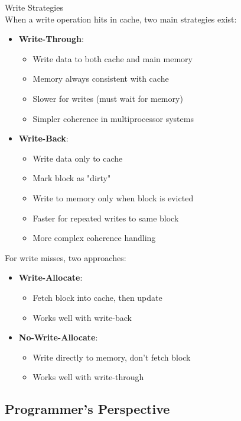 \begin{definition}{Write Strategies}\\
When a write operation hits in cache, two main strategies exist:
\begin{itemize}
    \item \textbf{Write-Through}:
    \begin{itemize}
        \item Write data to both cache and main memory
        \item Memory always consistent with cache
        \item Slower for writes (must wait for memory)
        \item Simpler coherence in multiprocessor systems
    \end{itemize}
    \item \textbf{Write-Back}:
    \begin{itemize}
        \item Write data only to cache
        \item Mark block as "dirty"
        \item Write to memory only when block is evicted
        \item Faster for repeated writes to same block
        \item More complex coherence handling
    \end{itemize}
\end{itemize}

For write misses, two approaches:
\begin{itemize}
    \item \textbf{Write-Allocate}:
    \begin{itemize}
        \item Fetch block into cache, then update
        \item Works well with write-back
    \end{itemize}
    \item \textbf{No-Write-Allocate}:
    \begin{itemize}
        \item Write directly to memory, don't fetch block
        \item Works well with write-through
    \end{itemize}
\end{itemize}
\end{definition}

\subsection{Programmer's Perspective}

